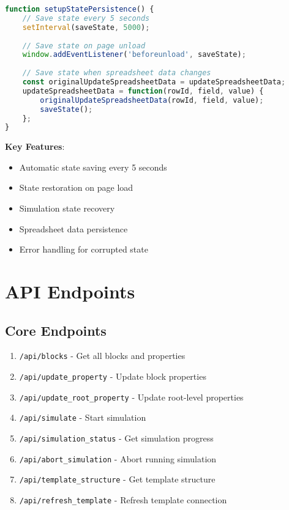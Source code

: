 \documentclass[12pt,a4paper]{article}
\begin{document}
\begin{lstlisting}[language=JavaScript, caption=State Persistence Implementation]
function setupStatePersistence() {
    // Save state every 5 seconds
    setInterval(saveState, 5000);
    
    // Save state on page unload
    window.addEventListener('beforeunload', saveState);
    
    // Save state when spreadsheet data changes
    const originalUpdateSpreadsheetData = updateSpreadsheetData;
    updateSpreadsheetData = function(rowId, field, value) {
        originalUpdateSpreadsheetData(rowId, field, value);
        saveState();
    };
}
\end{lstlisting}

\textbf{Key Features}:
\begin{itemize}
    \item Automatic state saving every 5 seconds
    \item State restoration on page load
    \item Simulation state recovery
    \item Spreadsheet data persistence
    \item Error handling for corrupted state
\end{itemize}

\section{API Endpoints}

\subsection{Core Endpoints}

\begin{enumerate}
    \item \texttt{/api/blocks} - Get all blocks and properties
    \item \texttt{/api/update\_property} - Update block properties
    \item \texttt{/api/update\_root\_property} - Update root-level properties
    \item \texttt{/api/simulate} - Start simulation
    \item \texttt{/api/simulation\_status} - Get simulation progress
    \item \texttt{/api/abort\_simulation} - Abort running simulation
    \item \texttt{/api/template\_structure} - Get template structure
    \item \texttt{/api/refresh\_template} - Refresh template connection
\end{enumerate}
\end{document}
